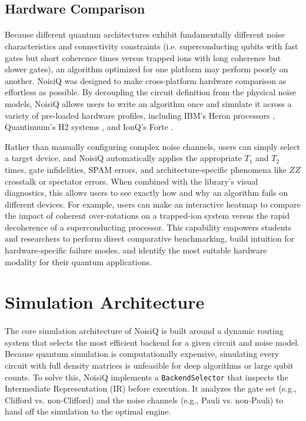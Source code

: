 \documentclass[10pt,twocolumn]{article}
\begin{document}
\subsection{Hardware Comparison}
\label{subsec:hardware_comparison}
\paragraph{}
    Because different quantum architectures exhibit fundamentally different noise characteristics and connectivity constraints 
(i.e. superconducting qubits with fast gates but short coherence times versus trapped ions with long coherence but slower gates), 
an algorithm optimized for one platform may perform poorly on another. 
NoisiQ was designed to make cross-platform hardware comparison as effortless as possible. 
By decoupling the circuit definition from the physical noise models, NoisiQ allows users to write an algorithm once and simulate it across a variety of pre-loaded hardware profiles, including IBM's Heron processors \cite{ibm_platform, abughanem2024}, Quantinuum's H2 systems \cite{quantinuum_h2_emergentmind, quantinuum_h2_docs}, and IonQ's Forte \cite{ionq_forte, ionq_forte_first}. 

    Rather than manually configuring complex noise channels, users can simply select a target device, 
and NoisiQ automatically applies the appropriate $T_1$ and $T_2$ times, gate infidelities, SPAM errors, and architecture-specific phenomena like $ZZ$ crosstalk or spectator errors. 
When combined with the library's visual diagnostics, this allows users to see exactly how and why an algorithm fails on different devices. 
For example, users can make an interactive heatmap to compare the impact of coherent over-rotations on a trapped-ion system versus the rapid decoherence of a superconducting processor. 
This capability empowers students and researchers to perform direct comparative benchmarking, build intuition for hardware-specific failure modes, and identify the most suitable hardware modality for their quantum applications.

\section{Simulation Architecture}
\label{subsec:architecture}
\paragraph{}
    The core simulation architecture of NoisiQ is built around a dynamic routing system that selects the most efficient backend for a given circuit and noise model. 
Because quantum simulation is computationally expensive, simulating every circuit with full density matrices is unfeasible for deep algorithms or large qubit counts. 
To solve this, NoisiQ implements a \texttt{BackendSelector} that inspects the Intermediate Representation (IR) before execution. 
It analyzes the gate set (e.g., Clifford vs. non-Clifford) and the noise channels (e.g., Pauli vs. non-Pauli) to hand off the simulation to the optimal engine.
\end{document}
